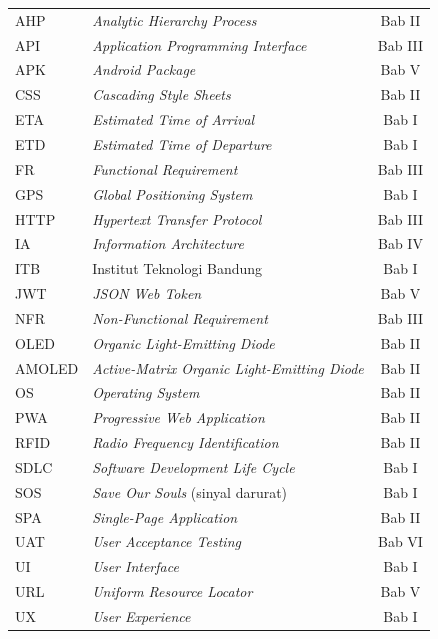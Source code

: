 \begin{longtable}{@{} l >{\raggedright\arraybackslash}p{7.5cm} c @{}}
AHP     & \textit{Analytic Hierarchy Process}                 & Bab II \\
API     & \textit{Application Programming Interface}          & Bab III \\
APK     & \textit{Android Package}                            & Bab V \\
CSS     & \textit{Cascading Style Sheets}                     & Bab II \\
ETA     & \textit{Estimated Time of Arrival}                  & Bab I \\
ETD     & \textit{Estimated Time of Departure}                & Bab I \\
FR      & \textit{Functional Requirement}                     & Bab III \\
GPS     & \textit{Global Positioning System}                  & Bab I \\
HTTP    & \textit{Hypertext Transfer Protocol}                & Bab III \\
IA      & \textit{Information Architecture}                   & Bab IV \\
ITB     & Institut Teknologi Bandung                          & Bab I \\
JWT     & \textit{JSON Web Token}                             & Bab V \\
NFR     & \textit{Non-Functional Requirement}                 & Bab III \\
OLED    & \textit{Organic Light-Emitting Diode}               & Bab II \\
AMOLED  & \textit{Active-Matrix Organic Light-Emitting Diode} & Bab II \\
OS      & \textit{Operating System}                           & Bab II \\
PWA     & \textit{Progressive Web Application}                & Bab II \\
RFID    & \textit{Radio Frequency Identification}             & Bab II \\
SDLC    & \textit{Software Development Life Cycle}            & Bab I \\
SOS     & \textit{Save Our Souls} (sinyal darurat)            & Bab I \\
SPA     & \textit{Single-Page Application}                    & Bab II \\
UAT     & \textit{User Acceptance Testing}                    & Bab VI \\
UI      & \textit{User Interface}                             & Bab I \\
URL     & \textit{Uniform Resource Locator}                   & Bab V \\
UX      & \textit{User Experience}                            & Bab I \\


\end{longtable}
